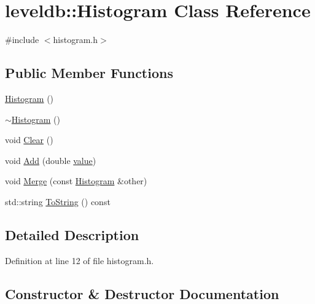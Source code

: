 \hypertarget{classleveldb_1_1_histogram}{}\section{leveldb\+:\+:Histogram Class Reference}
\label{classleveldb_1_1_histogram}


{\ttfamily \#include $<$histogram.\+h$>$}

\subsection*{Public Member Functions}
\begin{DoxyCompactItemize}
\item 
\hyperlink{classleveldb_1_1_histogram_a2b4d29303598913c7021d077e5a8b10f}{Histogram} ()
\item 
\hyperlink{classleveldb_1_1_histogram_a3f6375d4ef50956a540262a3cf720f13}{$\sim$\+Histogram} ()
\item 
void \hyperlink{classleveldb_1_1_histogram_ab30a7e767693010656d90bfd361ecb91}{Clear} ()
\item 
void \hyperlink{classleveldb_1_1_histogram_a7dd7147b7f6548f0bebde25ca40e4457}{Add} (double \hyperlink{cache_8cc_a0f61d63b009d0880a89c843bd50d8d76}{value})
\item 
void \hyperlink{classleveldb_1_1_histogram_a22befd197208f0142b236917bcadf196}{Merge} (const \hyperlink{classleveldb_1_1_histogram}{Histogram} \&other)
\item 
std\+::string \hyperlink{classleveldb_1_1_histogram_a78fde129eef6d9072ff986afd18d1163}{To\+String} () const 
\end{DoxyCompactItemize}


\subsection{Detailed Description}


Definition at line 12 of file histogram.\+h.



\subsection{Constructor \& Destructor Documentation}
\hypertarget{classleveldb_1_1_histogram_a2b4d29303598913c7021d077e5a8b10f}{}

